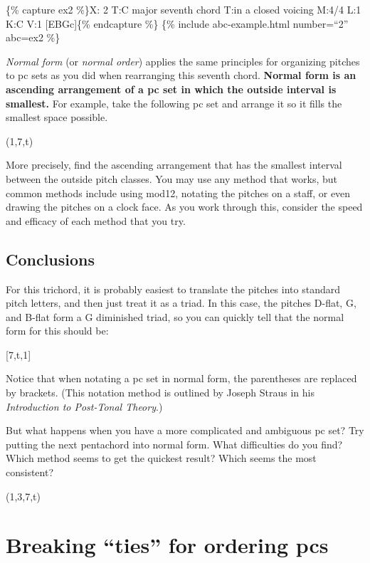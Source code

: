 \documentclass{book}
\begin{document}
\{\% capture ex2 \%\}X: 2 T:C major seventh chord T:in a closed voicing M:4/4
L:1 K:C V:1 {[}EBGc{]}\textbar{]}\{\% endcapture \%\} \{\% include
abc-example.html number=``2'' abc=ex2 \%\}

\emph{Normal form} (or \emph{normal order}) applies the same principles for
organizing pitches to pc sets as you did when rearranging this seventh chord.
\textbf{Normal form is an ascending arrangement of a pc set in which the
outside interval is smallest.} For example, take the following pc set and
arrange it so it fills the smallest space possible.

(1,7,t)

More precisely, find the ascending arrangement that has the smallest interval
between the outside pitch classes. You may use any method that works, but
common methods include using mod12, notating the pitches on a staff, or even
drawing the pitches on a clock face. As you work through this, consider the
speed and efficacy of each method that you try.

\hypertarget{conclusions-10}{%
\subsection{Conclusions}\label{conclusions-10}}

For this trichord, it is probably easiest to translate the pitches into
standard pitch letters, and then just treat it as a triad. In this case, the
pitches D-flat, G, and B-flat form a G diminished triad, so you can quickly
tell that the normal form for this should be:

{[}7,t,1{]}

Notice that when notating a pc set in normal form, the parentheses are
replaced by brackets. (This notation method is outlined by Joseph Straus in
his \emph{Introduction to Post-Tonal Theory}.)

But what happens when you have a more complicated and ambiguous pc set? Try
putting the next pentachord into normal form. What difficulties do you find?
Which method seems to get the quickest result? Which seems the most
consistent?

(1,3,7,t)

\hypertarget{breaking-ties-for-ordering-pcs}{%
\section{Breaking ``ties'' for ordering
pcs}\label{breaking-ties-for-ordering-pcs}}
\end{document}
